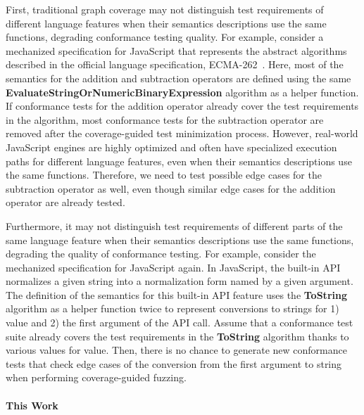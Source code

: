 \documentclass[acmsmall,review,screen]{acmart}
\newcommand{\jscode}[1]{\text{\lstinline[style=JS]!#1!}}
\begin{document}

First, traditional graph coverage may not distinguish test requirements of
different language features when their semantics descriptions
use the same functions, degrading conformance testing quality.
For example, consider a mechanized specification for JavaScript that represents the
abstract algorithms described in the official language specification, ECMA-262~\cite{es13}.
Here, most of the semantics for the addition and subtraction operators are
defined using the same \textbf{EvaluateStringOrNumericBinaryExpression}
algorithm as a helper function.
If conformance tests for the addition operator already cover the test
requirements in the algorithm, most conformance tests for the subtraction operator
are removed after the coverage-guided test minimization process.
However, real-world JavaScript engines are highly optimized and often have
specialized execution paths for different language features,
even when their semantics descriptions use the same functions.
Therefore, we need to test possible edge cases for the subtraction operator as
well, even though similar edge cases for the addition operator are already tested.


Furthermore, it may not distinguish test requirements of different
parts of the same language feature when their semantics descriptions
use the same functions, degrading the quality of conformance testing.
For example, consider the mechanized specification for JavaScript again.
In JavaScript, the \jscode{String.prototype.normalize} built-in API normalizes
a given string into a normalization form named by a given argument.
The definition of the semantics for this built-in API feature uses
the \textbf{ToString} algorithm as a helper function twice to represent
conversions to strings for 1) \jscode{this} value and 2) the first argument of the API call.
Assume that a conformance test suite already covers the test requirements in the
\textbf{ToString} algorithm thanks to various values for \jscode{this} value.
Then, there is no chance to generate new conformance tests that check edge cases
of the conversion from the first argument to string when performing coverage-guided fuzzing.


\paragraph{\textbf{This Work}}
\end{document}
